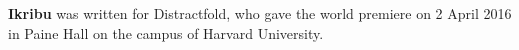 \textbf{Ikribu} was written for Distractfold, who gave the world premiere on 2
April 2016 in Paine Hall on the campus of Harvard University.
